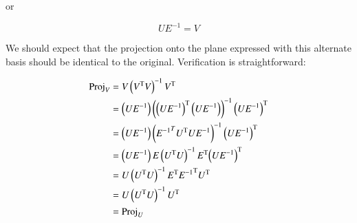 \documentclass{article}      %
\newcommand{\T}[0]{\text{T}}
\begin{document}
or

\[
U E^{-1} = V
\]

We should expect that the projection onto the plane expressed with this alternate basis should be identical to the original.  Verification
is straightforward:

\begin{align*}
\Proj_V 
&= V \left(V^\T V\right)^{-1} V^\T \\
&= \left(U E^{-1}\right) \left({\left(U E^{-1}\right)}^\T \left(U E^{-1}\right)\right)^{-1} {\left(U E^{-1}\right)}^\T \\
&= \left(U E^{-1}\right) \left( {E^{-1}}^T U^\T U E^{-1}\right)^{-1} {\left(U E^{-1}\right)}^\T \\
&= \left(U E^{-1}\right) E \left( U^\T U\right)^{-1} E^\T {\left(U E^{-1}\right)}^\T \\
&= U \left( U^\T U\right)^{-1} E^\T {E^{-1}}^\T U^\T \\
&= U \left( U^\T U\right)^{-1} U^\T \\
&= \Proj_U
\end{align*}
\end{document}
